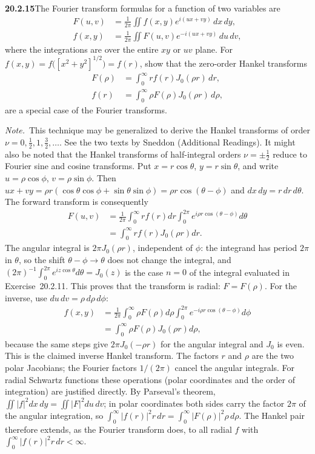 \par\bigskip
\noindent\textbf{20.2.15}\quad The Fourier transform formulas for a
function of two variables are
\begin{align*}
F(u,v)&=\frac{1}{2\pi}\iint
f(x,y)e^{i(ux+vy)}\,dx\,dy,\\
f(x,y)&=\frac{1}{2\pi}\iint
F(u,v)e^{-i(ux+vy)}\,du\,dv,
\end{align*}
where the integrations are over the entire $xy$ or $uv$ plane. For
$f(x,y)=f\big([x^{2}+y^{2}]^{1/2}\big)=f(r)$, show that the
zero-order Hankel transforms
\begin{align*}
F(\rho)&=\int_{0}^{\infty}r f(r)J_{0}(\rho r)\,dr,\\
f(r)&=\int_{0}^{\infty}\rho F(\rho)J_{0}(\rho r)\,d\rho,
\end{align*}
are a special case of the Fourier transforms.
\par\emph{Note.}~This technique may be generalized to derive the
Hankel transforms of order $\nu=0,\tfrac{1}{2},1,\tfrac{3}{2},
\ldots$. See the two texts by Sneddon (Additional Readings). It
might also be noted that the Hankel transforms of half-integral
orders $\nu=\pm\tfrac{1}{2}$ reduce to Fourier sine and cosine
transforms.
\solution
Put $x=r\cos\theta$, $y=r\sin\theta$, and write
$u=\rho\cos\phi$, $v=\rho\sin\phi$. Then
$ux+vy=\rho r(\cos\theta\cos\phi+\sin\theta\sin\phi)
=\rho r\cos(\theta-\phi)$ and $dx\,dy=r\,dr\,d\theta$.
The forward transform is consequently
\begin{align*}
F(u,v)&=\frac1{2\pi}\int_0^\infty rf(r)dr
\int_0^{2\pi}e^{i\rho r\cos(\theta-\phi)}d\theta\\
&=\int_0^\infty rf(r)J_0(\rho r)dr.
\end{align*}
The angular integral is $2\pi J_0(\rho r)$, independent of
$\phi$: the integrand has period $2\pi$ in $\theta$, so the shift
$\theta-\phi\to\theta$ does not change the integral, and
$(2\pi)^{-1}\int_0^{2\pi}e^{iz\cos\theta}d\theta=J_0(z)$ is the
case $n=0$ of the integral evaluated in Exercise~20.2.11. This
proves that the transform is radial: $F=F(\rho)$.
For the inverse, use $du\,dv=\rho\,d\rho\,d\phi$:
\begin{align*}
f(x,y)&=\frac1{2\pi}\int_0^\infty\rho F(\rho)d\rho
\int_0^{2\pi}e^{-i\rho r\cos(\theta-\phi)}d\phi\\
&=\int_0^\infty\rho F(\rho)J_0(\rho r)d\rho,
\end{align*}
because the same steps give $2\pi J_0(-\rho r)$ for the angular
integral and $J_0$ is even. This is the claimed inverse Hankel
transform. The factors $r$ and $\rho$ are the two polar Jacobians;
the Fourier factors $1/(2\pi)$ cancel the angular integrals.
For radial Schwartz functions these operations (polar coordinates
and the order of integration) are justified directly. By Parseval's
theorem, $\iint|f|^2dx\,dy=\iint|F|^2du\,dv$; in polar coordinates
both sides carry the factor $2\pi$ of the angular integration, so
$\int_0^\infty|f(r)|^2r\,dr=\int_0^\infty|F(\rho)|^2\rho\,d\rho$.
The Hankel pair therefore extends, as the Fourier transform does,
to all radial $f$ with $\int_0^\infty|f(r)|^2r\,dr<\infty$.

